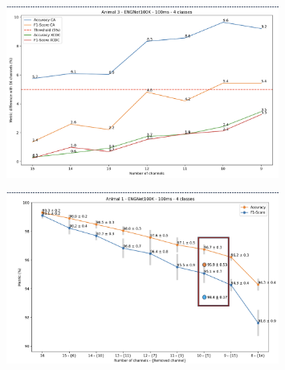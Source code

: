 \documentclass{Configuration_Files/PoliMi3i_thesis}
\begin{document}
\begin{figure}[H]
    \centering
    \includegraphics[width=0.8\textwidth]{Results Matteo/figure16}
    \label{fig:figure1}
\end{figure}

\begin{figure}[H]
    \centering
    \includegraphics[width=0.8\textwidth]{Results Matteo/figure17}
    \label{fig:figure1}
\end{figure}





\cleardoublepage
{} %
\appendix
\end{document}
